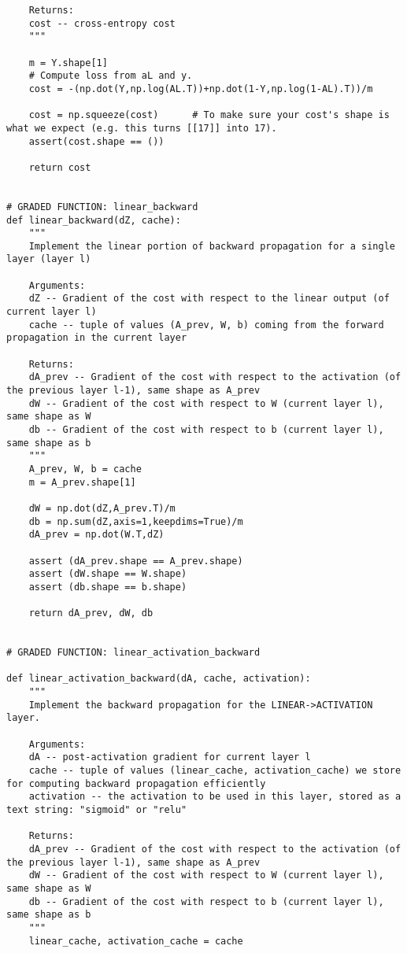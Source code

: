 {\begin{verbatim}
    Returns:
    cost -- cross-entropy cost
    """
    
    m = Y.shape[1]
    # Compute loss from aL and y.
    cost = -(np.dot(Y,np.log(AL.T))+np.dot(1-Y,np.log(1-AL).T))/m
    
    cost = np.squeeze(cost)      # To make sure your cost's shape is what we expect (e.g. this turns [[17]] into 17).
    assert(cost.shape == ())
    
    return cost


# GRADED FUNCTION: linear_backward
def linear_backward(dZ, cache):
    """
    Implement the linear portion of backward propagation for a single layer (layer l)

    Arguments:
    dZ -- Gradient of the cost with respect to the linear output (of current layer l)
    cache -- tuple of values (A_prev, W, b) coming from the forward propagation in the current layer

    Returns:
    dA_prev -- Gradient of the cost with respect to the activation (of the previous layer l-1), same shape as A_prev
    dW -- Gradient of the cost with respect to W (current layer l), same shape as W
    db -- Gradient of the cost with respect to b (current layer l), same shape as b
    """
    A_prev, W, b = cache
    m = A_prev.shape[1]

    dW = np.dot(dZ,A_prev.T)/m
    db = np.sum(dZ,axis=1,keepdims=True)/m
    dA_prev = np.dot(W.T,dZ)
    
    assert (dA_prev.shape == A_prev.shape)
    assert (dW.shape == W.shape)
    assert (db.shape == b.shape)
    
    return dA_prev, dW, db


# GRADED FUNCTION: linear_activation_backward

def linear_activation_backward(dA, cache, activation):
    """
    Implement the backward propagation for the LINEAR->ACTIVATION layer.
    
    Arguments:
    dA -- post-activation gradient for current layer l 
    cache -- tuple of values (linear_cache, activation_cache) we store for computing backward propagation efficiently
    activation -- the activation to be used in this layer, stored as a text string: "sigmoid" or "relu"
    
    Returns:
    dA_prev -- Gradient of the cost with respect to the activation (of the previous layer l-1), same shape as A_prev
    dW -- Gradient of the cost with respect to W (current layer l), same shape as W
    db -- Gradient of the cost with respect to b (current layer l), same shape as b
    """
    linear_cache, activation_cache = cache
    

\end{verbatim}}
